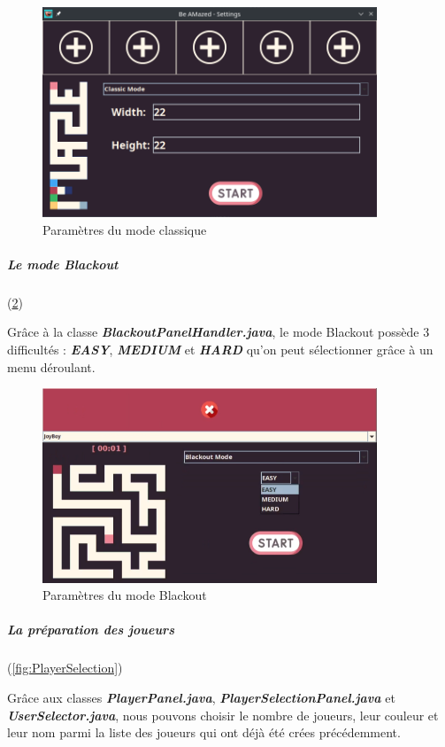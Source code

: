 \begin{figure}[h!]
    \centering
    \includegraphics[width=10cm]{ressources/Implementation/Labyrinthe/Controleur/SettingsMenu_ClassicMode.png}
    \caption{Paramètres du mode classique}
    \label{fig:ClassicMode}
\end{figure}
\FloatBarrier

\subparagraph*{Le mode Blackout} (\ref{fig:BlackoutModeDifficulty})

Grâce à la classe \textbf{\textit{BlackoutPanelHandler.java}}, le mode Blackout possède 3 difficultés : \textbf{\textit{EASY}}, \textbf{\textit{MEDIUM}} et \textbf{\textit{HARD}} qu'on peut sélectionner grâce à un menu déroulant.

\begin{figure}[h!]
    \centering
    \includegraphics[width=10cm]{ressources/Implementation/Labyrinthe/Controleur/SettingsMenu_BlackoutMode_Difficulty.png}
    \caption{Paramètres du mode Blackout}
    \label{fig:BlackoutModeDifficulty}
\end{figure}
\FloatBarrier

\newpage

\subparagraph*{La préparation des joueurs} (\ref{fig:PlayerSelection})

Grâce aux classes \textbf{\textit{PlayerPanel.java}}, \textbf{\textit{PlayerSelectionPanel.java}} et \textbf{\textit{UserSelector.java}}, nous pouvons choisir le nombre de joueurs, leur couleur et leur nom parmi la liste des joueurs qui ont déjà été crées précédemment.

